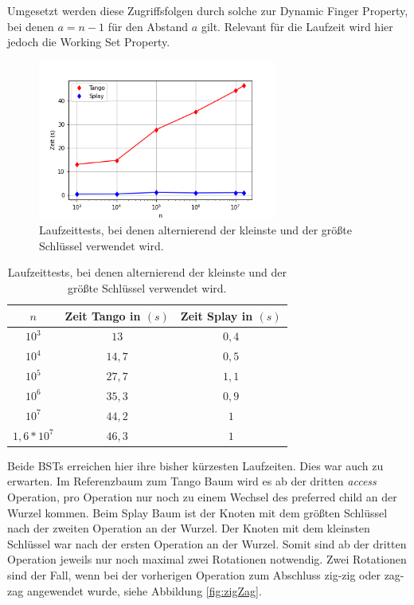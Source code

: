 \documentclass[a4paper,12pt]{article}
\begin{document}
\noindent Umgesetzt werden diese Zugriffsfolgen durch solche zur Dynamic Finger Property, bei denen $a = n -1$ für den Abstand $a$ gilt. Relevant für die Laufzeit wird hier jedoch die Working Set Property.

\begin{figure}[H]
	\centering
	\includegraphics[width=0.7\textwidth]{Medien/laufzeittest/diagramm/kleinGros}
	\caption{Laufzeittests, bei denen alternierend der kleinste und der größte Schlüssel verwendet wird.}
\end{figure}
\begin{table}[H]
	\begin{center}
		\begin{tabular}[c]{|c|c|c|}
			\hline
			$n$ & Zeit Tango in $\left(s\right)$ &Zeit Splay in $\left(s\right)$ \\
			\hline
			$10^3$ & $13$ &$0,4$ \\
			\hline
			$10^4$  & $14,7$ &$0,5$  \\
			\hline
			$10^5$  & $27,7$ &$1,1$  \\
			\hline
			$10^6$  & $35,3$ &$0,9$  \\
			\hline
			$10^7$  & $44,2$ &$1$  \\
			\hline
			$1,6 *10^7$  & $46,3$ &$1$  \\
			\hline
		\end{tabular}
		\caption{Laufzeittests, bei denen alternierend der kleinste und der größte Schlüssel verwendet wird.} 
	\end{center}
\end{table}
\noindent Beide BSTs erreichen hier ihre bisher kürzesten Laufzeiten. Dies war auch zu erwarten. Im Referenzbaum zum Tango Baum wird es ab der dritten \textit{access} Operation, pro Operation nur noch zu einem Wechsel des preferred child an der Wurzel kommen. Beim Splay Baum ist der Knoten mit dem größten Schlüssel nach der zweiten Operation an der Wurzel. Der Knoten mit dem kleinsten Schlüssel war nach der ersten Operation an der Wurzel. Somit sind ab der dritten Operation jeweils nur noch maximal zwei Rotationen notwendig. Zwei Rotationen sind der Fall, wenn bei der vorherigen Operation zum Abschluss zig-zig oder zag-zag angewendet wurde, siehe Abbildung \ref{fig:zigZag}.
 
\end{document}
